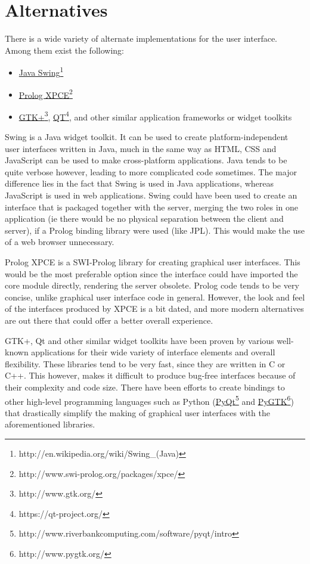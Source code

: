 \documentclass[11pt,twoside,a4paper]{report}
\begin{document}
\section{Alternatives}
\label{sec:clientalt}
There is a wide variety of alternate implementations for the user interface. Among them exist the following:
\begin{itemize}
\item
\href{http://en.wikipedia.org/wiki/Swing\_(Java)}{Java Swing}\footnote{http://en.wikipedia.org/wiki/Swing\_(Java)}
\item
\href{http://www.swi-prolog.org/packages/xpce/}{Prolog XPCE}\footnote{http://www.swi-prolog.org/packages/xpce/}
\item
\href{http://www.gtk.org/}{GTK+}\footnote{http://www.gtk.org/}, \href{https://qt-project.org/}{QT}\footnote{https://qt-project.org/}, and other similar application frameworks or widget toolkits
\end{itemize}

Swing is a Java widget toolkit. It can be used to create platform-independent user interfaces written in Java, much in the same way as HTML, CSS and JavaScript can be used to make cross-platform applications. Java tends to be quite verbose however, leading to more complicated code sometimes. The major difference lies in the fact that Swing is used in Java applications, whereas JavaScript is used in web applications. Swing could have been used to create an interface that is packaged together with the server, merging the two roles in one application (ie there would be no physical separation between the client and server), if a Prolog binding library were used (like JPL). This would make the use of a web browser unnecessary.

Prolog XPCE is a SWI-Prolog library for creating graphical user interfaces. This would be the most preferable option since the interface could have imported the core module directly, rendering the server obsolete. Prolog code tends to be very concise, unlike graphical user interface code in general. However, the look and feel of the interfaces produced by XPCE is a bit dated, and more modern alternatives are out there that could offer a better overall experience.

GTK+, Qt and other similar widget toolkits have been proven by various well-known applications for their wide variety of interface elements and overall flexibility. These libraries tend to be very fast, since they are written in C or C++. This however, makes it difficult to produce bug-free interfaces because of their complexity and code size. There have been efforts to create bindings to other high-level programming languages such as Python (\href{http://www.riverbankcomputing.com/software/pyqt/intro}{PyQt}\footnote{http://www.riverbankcomputing.com/software/pyqt/intro} and \href{http://www.pygtk.org/}{PyGTK}\footnote{http://www.pygtk.org/}) that drastically simplify the making of graphical user interfaces with the aforementioned libraries.
\end{document}
